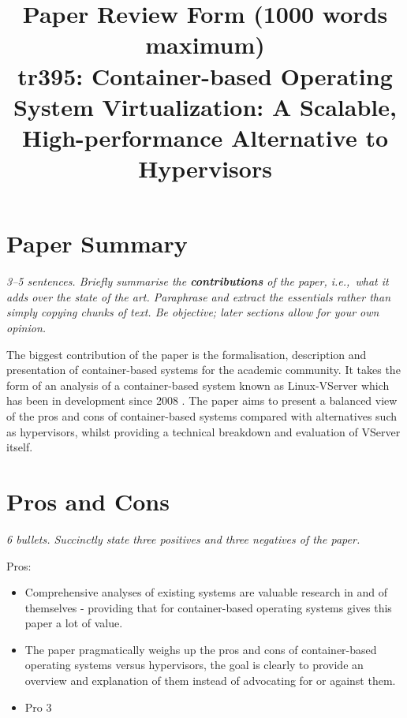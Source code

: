 \documentclass[11pt]{article}
\begin{document}

\title{Paper Review Form (1000 words maximum)\\
    tr395: Container-based Operating System Virtualization: A Scalable, High-performance Alternative to Hypervisors \cite{Containers}}

\maketitle

\section*{Paper Summary}

\textsl{3--5 sentences. Briefly summarise the {\bf contributions} of the paper,
i.e.,~what it adds over the state of the art. Paraphrase and extract the
essentials rather than simply copying chunks of text. Be objective; later
sections allow for your own opinion.}

The biggest contribution of the paper is the formalisation, description and
presentation of container-based systems for the academic community. It takes
the form of an analysis of a container-based system known as Linux-VServer
which has been in development since 2008 \cite{LinuxVServer}. The paper aims to
present a balanced view of the pros and cons of container-based systems
compared with alternatives such as hypervisors, whilst providing a technical
breakdown and evaluation of VServer itself.

\section*{Pros and Cons}

\textsl{6 bullets. Succinctly state three positives and three negatives of the
paper.}

Pros:

\begin{itemize}

    \item Comprehensive analyses of existing systems are valuable research in
    and of themselves - providing that for container-based operating systems
    gives this paper a lot of value.

    \item The paper pragmatically weighs up the pros and cons of
    container-based operating systems versus hypervisors, the goal is clearly
    to provide an overview and explanation of them instead of advocating for or
    against them.

    \item Pro 3

\end{itemize}
\end{document}
